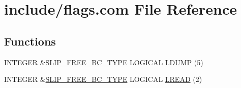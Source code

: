 \hypertarget{flags_8com}{\section{include/flags.com File Reference}
\label{flags_8com}
}
\subsection*{Functions}
\begin{DoxyCompactItemize}
\item 
I\-N\-T\-E\-G\-E\-R \&\hyperlink{flags_8com_a6beb6f16ff7301fc1f9a031b0f564045}{S\-L\-I\-P\-\_\-\-F\-R\-E\-E\-\_\-\-B\-C\-\_\-\-T\-Y\-P\-E} L\-O\-G\-I\-C\-A\-L \hyperlink{flags_8com_a56577bf0709747e4804db4d3bb3ca810}{L\-D\-U\-M\-P} (5)
\item 
I\-N\-T\-E\-G\-E\-R \&\hyperlink{flags_8com_a6beb6f16ff7301fc1f9a031b0f564045}{S\-L\-I\-P\-\_\-\-F\-R\-E\-E\-\_\-\-B\-C\-\_\-\-T\-Y\-P\-E} L\-O\-G\-I\-C\-A\-L \hyperlink{flags_8com_aea278b60e9a744704973b7b8aecd9442}{L\-R\-E\-A\-D} (2)
\end{DoxyCompactItemize}
